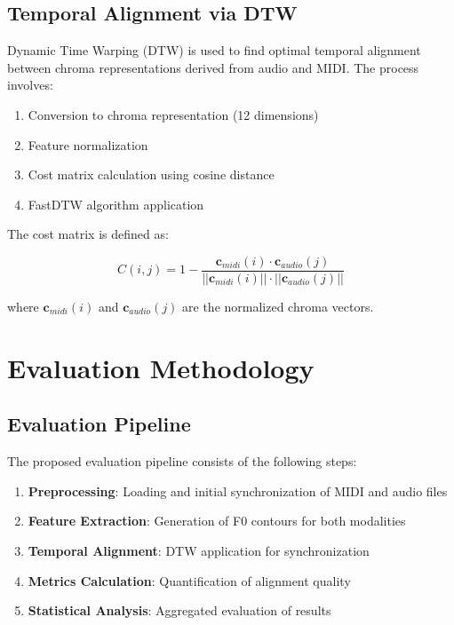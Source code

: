 \documentclass[12pt,a4paper]{article}
\begin{document}
\subsection{Temporal Alignment via DTW}

Dynamic Time Warping (DTW) is used to find optimal temporal alignment between chroma representations derived from audio and MIDI. The process involves:

\begin{enumerate}
    \item Conversion to chroma representation (12 dimensions)
    \item Feature normalization
    \item Cost matrix calculation using cosine distance
    \item FastDTW algorithm application
\end{enumerate}

The cost matrix is defined as:

\begin{equation}
C(i,j) = 1 - \frac{\mathbf{c}_{midi}(i) \cdot \mathbf{c}_{audio}(j)}{||\mathbf{c}_{midi}(i)|| \cdot ||\mathbf{c}_{audio}(j)||}
\end{equation}

where $\mathbf{c}_{midi}(i)$ and $\mathbf{c}_{audio}(j)$ are the normalized chroma vectors.

\section{Evaluation Methodology}
\label{sec:metodologia}

\subsection{Evaluation Pipeline}

The proposed evaluation pipeline consists of the following steps:

\begin{enumerate}
    \item \textbf{Preprocessing}: Loading and initial synchronization of MIDI and audio files
    \item \textbf{Feature Extraction}: Generation of F0 contours for both modalities
    \item \textbf{Temporal Alignment}: DTW application for synchronization
    \item \textbf{Metrics Calculation}: Quantification of alignment quality
    \item \textbf{Statistical Analysis}: Aggregated evaluation of results
\end{enumerate}
\end{document}
